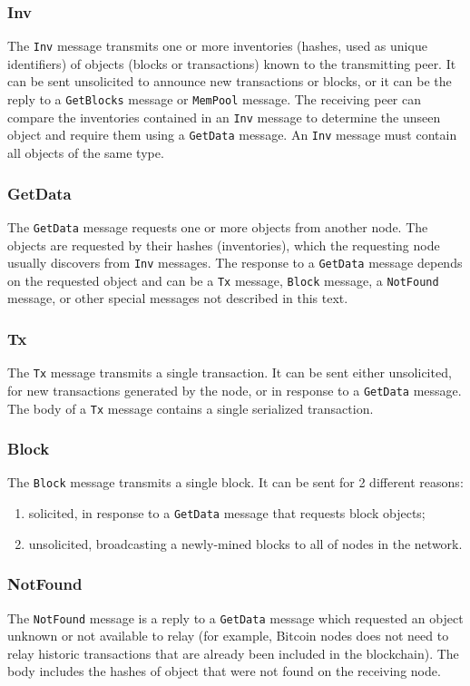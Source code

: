 \subsubsection{Inv}
The \texttt{Inv} message transmits one or more inventories (hashes, used as unique identifiers) of objects (blocks or transactions) known to the transmitting peer.
It can be sent unsolicited to announce new transactions or blocks, or it can be the reply to a \texttt{GetBlocks} message or \texttt{MemPool} message.
The receiving peer can compare the inventories contained in an \texttt{Inv} message to determine the unseen object and require them using a \texttt{GetData} message.
An \texttt{Inv} message must contain all objects of the same type.

\subsubsection{GetData}
The \texttt{GetData} message requests one or more objects from another node.
The objects are requested by their hashes (inventories), which the requesting node usually discovers from \texttt{Inv} messages.
The response to a \texttt{GetData} message depends on the requested object and can be a \texttt{Tx} message, \texttt{Block} message, a \texttt{NotFound} message, or other special messages not described in this text.

\subsubsection{Tx}
The \texttt{Tx} message transmits a single transaction.
It can be sent either unsolicited, for new transactions generated by the node, or in response to a \texttt{GetData} message.
The body of a \texttt{Tx} message contains a single serialized transaction.

\subsubsection{Block}
The \texttt{Block} message transmits a single block.
It can be sent for \num{2} different reasons:
\begin{enumerate}
	\item solicited, in response to a \texttt{GetData} message that requests block objects;
	\item unsolicited, broadcasting a newly-mined blocks to all of nodes in the network.
\end{enumerate}

\subsubsection{NotFound}
The \texttt{NotFound} message is a reply to a \texttt{GetData} message which requested an object unknown or not available to relay (for example, Bitcoin nodes does not need to relay historic transactions that are already been included in the blockchain).
The body includes the hashes of object that were not found on the receiving node.
